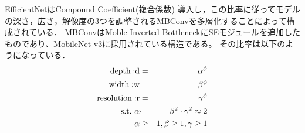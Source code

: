     EfficientNetはCompound Coefficient(複合係数) 導入し，この比率に従ってモデルの深さ，広さ，解像度の3つを調整されるMBConv\cite{howard2019searching}を多層化することによって構成されている．
    MBConvはMoble Inverted BottleneckにSEモジュールを追加したものであり、MobileNet-v3に採用されている構造である。
    その比率は以下のようになっている．
    \begin{eqnarray}
        \rm{depth:}d &=& \alpha^\phi \\
        \rm{width:}w &=& \beta^\phi \\
        \rm{resolution:}r &=& \gamma^\phi \\
        \rm{s.t.}\ \alpha&\cdot&\beta^{2}\cdot\gamma^{2}\approx2\\
        \alpha &\geq& 1, \beta \geq 1, \gamma \geq 1
    \end{eqnarray}
